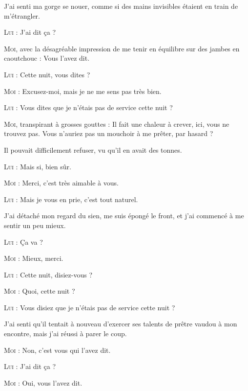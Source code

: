 J’ai senti ma gorge se nouer, comme si des mains invisibles étaient en train de m’étrangler.

\begin{dialogue}

\textsc{Lui} : J’ai dit ça ?

\textsc{Moi}, avec la désagréable impression de me tenir en équilibre sur des jambes en caoutchouc : Vous l’avez dit.

\textsc{Lui} : Cette nuit, vous dites ?

\textsc{Moi} : Excusez-moi, mais je ne me sens pas très bien.

\textsc{Lui} : Vous dites que je n’étais pas de service cette nuit ?

\textsc{Moi}, transpirant à grosses gouttes : Il fait une chaleur à crever, ici, vous ne trouvez pas. Vous n’auriez pas un mouchoir à me prêter, par hasard ?

\end{dialogue}

Il pouvait difficilement refuser, vu qu’il en avait des tonnes.

\begin{dialogue}

\textsc{Lui} : Mais si, bien sûr.

\textsc{Moi} : Merci, c’est très aimable à vous.

\textsc{Lui} : Mais je vous en prie, c’est tout naturel.

\end{dialogue}

J’ai détaché mon regard du sien, me suis épongé le front, et j’ai commencé à me sentir un peu mieux.

\begin{dialogue}

\textsc{Lui} : Ça va ?

\textsc{Moi} : Mieux, merci.

\textsc{Lui} : Cette nuit, disiez-vous ?

\textsc{Moi} : Quoi, cette nuit ?

\textsc{Lui} : Vous disiez que je n’étais pas de service cette nuit ?

\end{dialogue}

J’ai senti qu’il tentait à nouveau d’exercer ses talents de prêtre vaudou à mon encontre, mais j’ai réussi à parer le coup.

\begin{dialogue}

\textsc{Moi} : Non, c’est vous qui l’avez dit.

\textsc{Lui} : J’ai dit ça ?

\textsc{Moi} : Oui, vous l’avez dit.

\end{dialogue}

